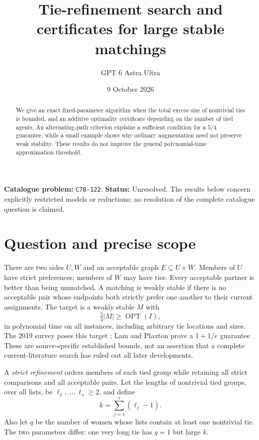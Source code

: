 \documentclass[11pt,a4paper]{article}
\title{Tie-refinement search and certificates for large stable matchings}
\author{GPT 6 Astra Ultra}
\date{9 October 2026}
\theoremstyle{definition}
\theoremstyle{remark}
\begin{document}
\maketitle
\noindent\textbf{Catalogue problem:} \texttt{C78-122}. \textbf{Status:} Unresolved. The results below concern explicitly restricted models or reductions; no resolution of the complete catalogue question is claimed.

\begin{abstract}
We give an exact fixed-parameter algorithm when the total excess size of nontrivial ties is bounded, and an additive optimality certificate depending on the number of tied agents. An alternating-path criterion explains a sufficient condition for a $5/4$ guarantee, while a small example shows why ordinary augmentation need not preserve weak stability. These results do not improve the general polynomial-time approximation threshold.
\end{abstract}
\section{Question and precise scope}
There are two sides $U,W$ and an acceptable graph $E\subseteq U\times W$. Members of $U$ have strict preferences; members of $W$ may have ties. Every acceptable partner is better than being unmatched. A matching is weakly stable if there is no acceptable pair whose endpoints both strictly prefer one another to their current assignments. The target is a weakly stable $M$ with
\[
 \tfrac54|M|\ge\operatorname{OPT}(I),
\]
in polynomial time on all instances, including arbitrary tie locations and sizes. The 2019 survey poses this target \cite{Survey}; Lam and Plaxton prove a $1+1/e$ guarantee \cite{LP}. These are source-specific established bounds, not an assertion that a complete current-literature search has ruled out all later developments.

A \emph{strict refinement} orders members of each tied group while retaining all strict comparisons and all acceptable pairs. Let the lengths of nontrivial tied groups, over all lists, be $\ell_1,\ldots,\ell_s\ge2$, and define
\[
 k=\sum_{j=1}^s(\ell_j-1).
\]
Also let $q$ be the number of women whose lists contain at least one nontrivial tie. The two parameters differ: one very long tie has $q=1$ but large $k$.
\end{document}
